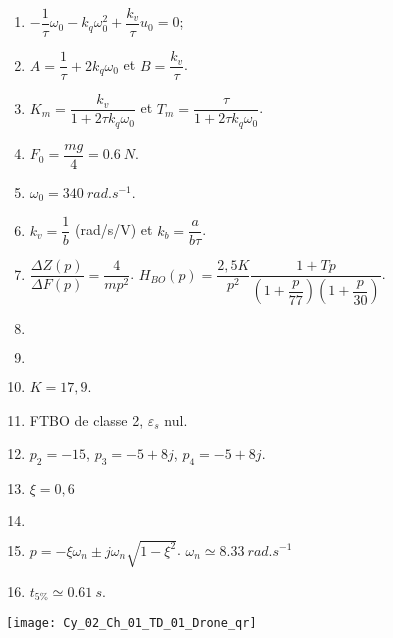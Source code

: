 \ifprof
\else
\ifcolle
\else
\begin{solution}
\begin{enumerate}
\item $-\dfrac{1}{\tau}\omega_0 - k_q \omega_0^2 + \dfrac{k_v}{\tau}u_0=0$;
\item $A=\dfrac{1}{\tau}+2k_q\omega_0$ et $B=\dfrac{k_v}{\tau}$.
\item $K_m=\dfrac{k_v}{1+2\tau k_q \omega_0}$ et $T_m=\dfrac{\tau}{1+2\tau k_q \omega_0}$.
\item $F_0=\dfrac{mg}{4}=\SI{0,6}{N}$.
\item $\omega_0=\SI{340}{rad.s^{-1}}$.
\item $k_v=\dfrac{1}{b}$ (rad/s/V) et $k_b=\dfrac{a}{b\tau}$.
\item $\dfrac{\Delta Z(p)}{\Delta F(p)}=\dfrac{4}{mp^2}$. $H_{BO}(p)=\dfrac{2,5 K}{p^2}\dfrac{1+Tp}{\left( 1+\dfrac{p}{77}\right)\left(1+\dfrac{p}{30} \right)}$.
\item  $\quad$
\item $\quad$
\item $K=17,9$.
\item FTBO  de classe 2, $\varepsilon_s$ nul.
\item $p_2=-15$, $p_3 = -5+8j$, $p_4=-5+8j$.
\item $\xi=0,6$
\item $\quad$
\item $p=-\xi\omega_n \pm j\omega_n \sqrt{1-\xi^2}$. $\omega_n\simeq \SI{8,33}{rad.s^{-1}}$
\item $t_{5\%}\simeq \SI{0,61}{ s}$. 
\end{enumerate}
\end{solution} 
\fi
\fi

\ifprof
\else
\begin{marginfigure}[-3cm]
\centering
\texttt{[image: Cy\_02\_Ch\_01\_TD\_01\_Drone\_qr]}
\end{marginfigure}
\fi
